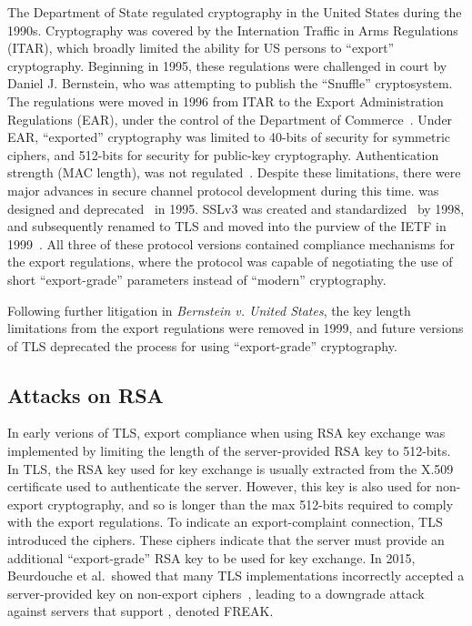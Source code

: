 The Department of State regulated cryptography in the United States during
the 1990s. Cryptography was covered by the Internation Traffic in Arms
Regulations (ITAR), which broadly limited the ability for US persons to
``export'' cryptography. Beginning in 1995, these regulations were challenged
in court by Daniel J. Bernstein, who was attempting to publish the
``Snuffle'' cryptosystem. The regulations were moved in 1996 from ITAR to the
Export Administration Regulations (EAR), under the control of the Department
of Commerce~\cite{djb-case-status}. Under EAR, ``exported'' cryptography was
limited to 40-bits of security for symmetric ciphers, and 512-bits for
security for public-key cryptography. Authentication strength (\eg MAC
length), was not regulated~\cite{ear-2001-cat-5}. Despite these limitations,
there were major advances in secure channel protocol development during this time.
\ssltwo was designed and deprecated~\cite{sslv2} in 1995. SSLv3 was created and
standardized~\cite{rfc6101} by 1998, and subsequently renamed to TLS and
moved into the purview of the IETF in 1999~\cite{rfc2246}. All three of these
protocol versions contained compliance mechanisms for the export regulations,
where the protocol was capable of negotiating the use of short
``export-grade'' parameters instead of ``modern'' cryptography.

Following further litigation in \textit{Bernstein v. United States}, the key
length limitations from the export regulations were removed in 1999, and
future versions of TLS deprecated the process for using ``export-grade''
cryptography.

\subsection{Attacks on RSA}

In early verions of TLS, export compliance when using RSA key exchange was
implemented by limiting the length of the server-provided RSA key to
512-bits. In TLS, the RSA key used for key exchange is usually extracted from
the X.509 certificate used to authenticate the server. However, this key is
also used for non-export cryptography, and so is longer than the max 512-bits
required to comply with the export regulations. To indicate an
export-complaint connection, TLS introduced the \rsaexp{} ciphers. These
ciphers indicate that the server must provide an additional ``export-grade''
RSA key to be used for key exchange. In 2015, Beurdouche et al.\ showed that
many TLS implementations incorrectly accepted a server-provided \rsaexp{} key
on non-export \rsa{} ciphers~\cite{freak-attack-2015}, leading to a downgrade
attack against servers that support \rsaexp{}, denoted FREAK.

